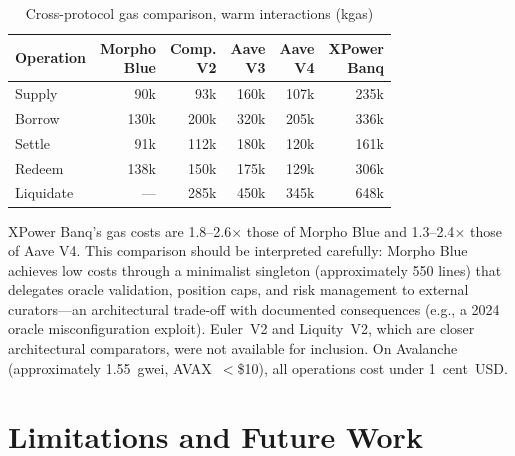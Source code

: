 \documentclass[10pt,a4paper,twocolumn]{article}
\theoremstyle{definition}
\theoremstyle{plain}
\theoremstyle{remark}
\begin{document}
\begin{table}[htbp]
\centering
\caption{Cross-protocol gas comparison, warm interactions (kgas)}
\label{tab:gas-comparison}
\small
\begin{tabularx}{0.95\columnwidth}{@{}X rrrrr@{}}
\toprule
\shortstack[l]{\vphantom{Xp}Operation\\\vphantom{Xp}} & \shortstack[r]{\vphantom{Xp}Morpho\\\vphantom{Xp}Blue} & \shortstack[r]{\vphantom{Xp}Comp.\\\vphantom{Xp}V2} & \shortstack[r]{\vphantom{Xp}Aave\\\vphantom{Xp}V3} & \shortstack[r]{\vphantom{Xp}Aave\\\vphantom{Xp}V4} & \shortstack[r]{\vphantom{Xp}XPower\\\vphantom{Xp}Banq} \\
\midrule
Supply & 90k & 93k & 160k & 107k & 235k \\
Borrow & 130k & 200k & 320k & 205k & 336k \\
Settle & 91k & 112k & 180k & 120k & 161k \\
Redeem & 138k & 150k & 175k & 129k & 306k \\
Liquidate & --- & 285k & 450k & 345k & 648k \\
\bottomrule
\end{tabularx}
\end{table}

XPower Banq's gas costs are 1.8--2.6$\times$ those of Morpho Blue and 1.3--2.4$\times$ those of Aave V4. This comparison should be interpreted carefully: Morpho Blue achieves low costs through a minimalist singleton (approximately 550 lines) that delegates oracle validation, position caps, and risk management to external curators---an architectural trade-off with documented consequences (e.g., a 2024 oracle misconfiguration exploit). Euler~V2 and Liquity~V2, which are closer architectural comparators, were not available for inclusion. On Avalanche (approximately 1.55~gwei, AVAX~$<$\$10), all operations cost under 1~cent~USD.

\section{Limitations and Future Work}
\label{sec:limitations}
\end{document}
